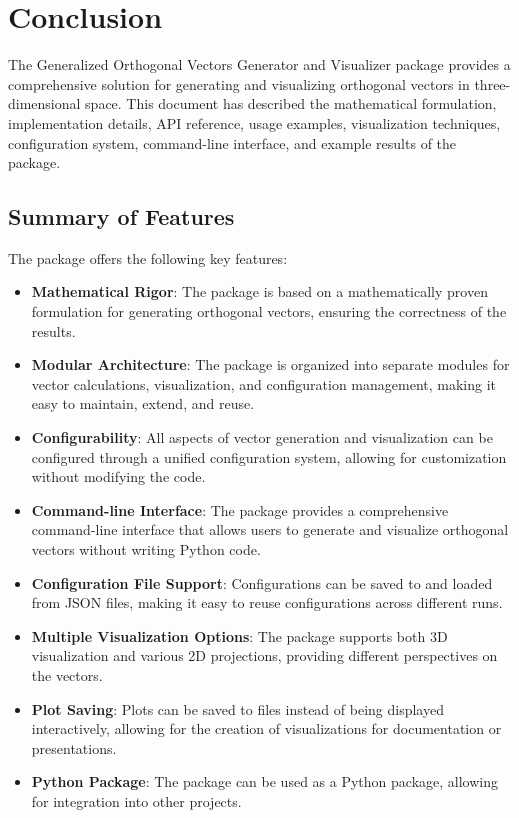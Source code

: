 \section{Conclusion}

The Generalized Orthogonal Vectors Generator and Visualizer package provides a comprehensive solution for generating and visualizing orthogonal vectors in three-dimensional space. This document has described the mathematical formulation, implementation details, API reference, usage examples, visualization techniques, configuration system, command-line interface, and example results of the package.

\subsection{Summary of Features}

The package offers the following key features:

\begin{itemize}
    \item \textbf{Mathematical Rigor}: The package is based on a mathematically proven formulation for generating orthogonal vectors, ensuring the correctness of the results.
    
    \item \textbf{Modular Architecture}: The package is organized into separate modules for vector calculations, visualization, and configuration management, making it easy to maintain, extend, and reuse.
    
    \item \textbf{Configurability}: All aspects of vector generation and visualization can be configured through a unified configuration system, allowing for customization without modifying the code.
    
    \item \textbf{Command-line Interface}: The package provides a comprehensive command-line interface that allows users to generate and visualize orthogonal vectors without writing Python code.
    
    \item \textbf{Configuration File Support}: Configurations can be saved to and loaded from JSON files, making it easy to reuse configurations across different runs.
    
    \item \textbf{Multiple Visualization Options}: The package supports both 3D visualization and various 2D projections, providing different perspectives on the vectors.
    
    \item \textbf{Plot Saving}: Plots can be saved to files instead of being displayed interactively, allowing for the creation of visualizations for documentation or presentations.
    
    \item \textbf{Python Package}: The package can be used as a Python package, allowing for integration into other projects.
\end{itemize}

